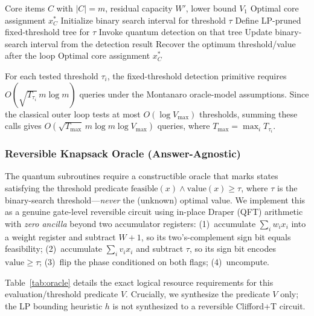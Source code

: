 \documentclass[conference]{IEEEtran} \IEEEoverridecommandlockouts
\begin{document}
\begin{algorithm}[h]
\caption{Classical Threshold-Search Outer Loop (Phase 2)}
\label{alg:qbb}
\begin{algorithmic}[1]
\REQUIRE Core items $C$ with $|C| = m$, residual capacity $W'$, lower bound $V_1$
\ENSURE Optimal core assignment $x^*_C$
\STATE Initialize binary search interval for threshold $\tau$
\STATE Define LP-pruned fixed-threshold tree for $\tau$
\STATE Invoke quantum detection on that tree
\STATE Update binary-search interval from the detection result
\ENDWHILE
\STATE Recover the optimum threshold/value after the loop
\RETURN Optimal core assignment $x^*_C$
\end{algorithmic}
\end{algorithm}

For each tested threshold $\tau_i$, the fixed-threshold detection primitive requires $O(\sqrt{T_{\tau_i}}\,m\log m)$ queries under the Montanaro oracle-model assumptions. Since the classical outer loop tests at most $O(\log V_{\max})$ thresholds, summing these calls gives $O(\sqrt{T_{\max}}\,m\log m\log V_{\max})$ queries, where $T_{\max}=\max_i T_{\tau_i}$.

\subsubsection{Reversible Knapsack Oracle (Answer-Agnostic)}
\label{sec:oracle-impl}

The quantum subroutines require a constructible oracle that marks states satisfying the threshold predicate $\text{feasible}(x) \wedge \text{value}(x) \geq \tau$, where $\tau$ is the binary-search threshold---\textit{never} the (unknown) optimal value. We implement this as a genuine gate-level reversible circuit using in-place Draper (QFT) arithmetic with \textit{zero ancilla} beyond two accumulator registers: (1)~accumulate $\sum_i w_i x_i$ into a weight register and subtract $W{+}1$, so its two's-complement sign bit equals feasibility; (2)~accumulate $\sum_i v_i x_i$ and subtract $\tau$, so its sign bit encodes $\text{value} \geq \tau$; (3)~flip the phase conditioned on both flags; (4)~uncompute. 

Table~\ref{tab:oracle} details the exact logical resource requirements for this evaluation/threshold predicate $V$. Crucially, we synthesize the predicate $V$ only; the LP bounding heuristic $h$ is not synthesized to a reversible Clifford+T circuit. 
\end{document}
